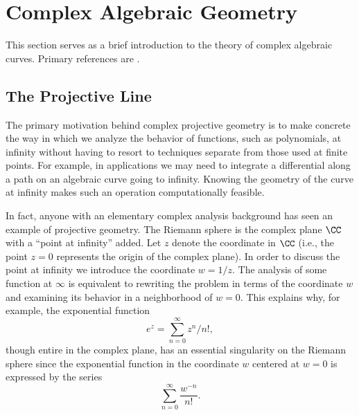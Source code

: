 \section{Complex Algebraic Geometry}

This section serves as a brief introduction to the theory of complex
algebraic curves. Primary references are \cite{Ueno97,Griffiths89}.

\subsection{The Projective Line}

The primary motivation behind complex projective geometry is to make concrete
the way in which we analyze the behavior of functions, such as
polynomials, at infinity without having to resort to techniques separate
from those used at finite points. For example, in applications we may
need to integrate a differential along a path on an algebraic curve
going to infinity. Knowing the geometry of the curve at infinity makes
such an operation computationally feasible.

In fact, anyone with an elementary complex analysis background has seen
an example of projective geometry. The Riemann sphere is the complex
plane $\CC$ with a ``point at infinity'' added. Let $z$ denote the
coordinate in $\CC$ (i.e., the point $z=0$ represents the origin of the
complex plane). In order to discuss the point at infinity we introduce
the coordinate $w = 1/z$. The analysis of some function at $\infty$ is
equivalent to rewriting the problem in terms of the coordinate $w$ and
examining its behavior in a neighborhood of $w=0$. This explains why,
for example, the exponential function
\[
    e^z = \sum_{n=0}^\infty z^n / n!,
\]
though entire in the complex plane, has an essential singularity on the
Riemann sphere since the exponential function in the coordinate $w$
centered at $w=0$ is expressed by the series
\[
    \sum_{n=0}^\infty \frac{w^{-n}}{n!}.
\]

